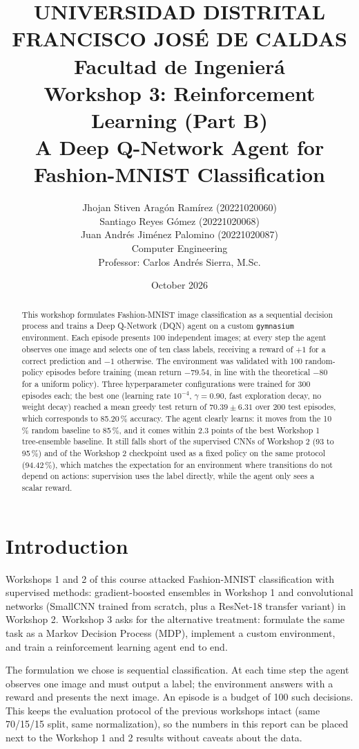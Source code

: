 \documentclass[11pt,a4paper]{article}
\title{\vspace{-1.5cm}UNIVERSIDAD DISTRITAL FRANCISCO JOS\'E DE CALDAS\\[2mm]
\large Facultad de Ingenier\'a\\[10mm]
\Large Workshop 3: Reinforcement Learning (Part B)\\[2mm]
\large A Deep Q-Network Agent for Fashion-MNIST Classification}
\author{Jhojan Stiven Arag\'on Ram\'irez (20221020060)\\
Santiago Reyes G\'omez (20221020068)\\
Juan Andr\'es Jim\'enez Palomino (20221020087)\\[4mm]
\normalsize Computer Engineering\\
Professor: Carlos Andr\'es Sierra, M.Sc.}
\date{October 2026}
\begin{document}
\maketitle

\begin{abstract}
This workshop formulates Fashion-MNIST image classification as a sequential decision process and trains a Deep Q-Network (DQN) agent on a custom \texttt{gymnasium} environment. Each episode presents 100 independent images; at every step the agent observes one image and selects one of ten class labels, receiving a reward of $+1$ for a correct prediction and $-1$ otherwise. The environment was validated with 100 random-policy episodes before training (mean return $-79.54$, in line with the theoretical $-80$ for a uniform policy). Three hyperparameter configurations were trained for 300 episodes each; the best one (learning rate $10^{-4}$, $\gamma=0.90$, fast exploration decay, no weight decay) reached a mean greedy test return of $70.39 \pm 6.31$ over 200 test episodes, which corresponds to 85.20\,\% accuracy. The agent clearly learns: it moves from the 10\,\% random baseline to 85\,\%, and it comes within 2.3 points of the best Workshop 1 tree-ensemble baseline. It still falls short of the supervised CNNs of Workshop 2 (93 to 95\,\%) and of the Workshop 2 checkpoint used as a fixed policy on the same protocol (94.42\,\%), which matches the expectation for an environment where transitions do not depend on actions: supervision uses the label directly, while the agent only sees a scalar reward.
\end{abstract}

\tableofcontents
\newpage

\section{Introduction}

Workshops 1 and 2 of this course attacked Fashion-MNIST classification with supervised methods: gradient-boosted ensembles in Workshop 1 and convolutional networks (SmallCNN trained from scratch, plus a ResNet-18 transfer variant) in Workshop 2. Workshop 3 asks for the alternative treatment: formulate the same task as a Markov Decision Process (MDP), implement a custom environment, and train a reinforcement learning agent end to end.

The formulation we chose is sequential classification. At each time step the agent observes one image and must output a label; the environment answers with a reward and presents the next image. An episode is a budget of 100 such decisions. This keeps the evaluation protocol of the previous workshops intact (same 70/15/15 split, same normalization), so the numbers in this report can be placed next to the Workshop 1 and 2 results without caveats about the data.
\end{document}

